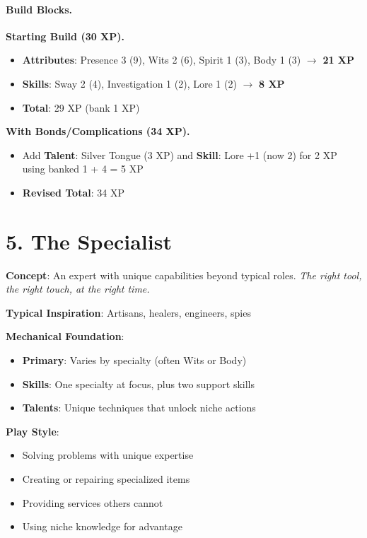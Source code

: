 \paragraph{Build Blocks.}
\textbf{Starting Build (30 XP).}
\begin{itemize}
\item \textbf{Attributes}: Presence 3 (9), Wits 2 (6), Spirit 1 (3), Body 1 (3) $\rightarrow$ \textbf{21 XP}
\item \textbf{Skills}: Sway 2 (4), Investigation 1 (2), Lore 1 (2) $\rightarrow$ \textbf{8 XP}
\item \textbf{Total}: 29 XP (bank 1 XP)
\end{itemize}
\textbf{With Bonds/Complications (34 XP).}
\begin{itemize}
\item Add \textbf{Talent}: Silver Tongue (3 XP) and \textbf{Skill}: Lore +1 (now 2) for 2 XP using banked 1 + 4 = 5 XP
\item \textbf{Revised Total}: 34 XP
\end{itemize}

\section{5. The Specialist}

\textbf{Concept}: An expert with unique capabilities beyond typical roles. \emph{The right tool, the right touch, at the right time.}

\textbf{Typical Inspiration}: Artisans, healers, engineers, spies

\textbf{Mechanical Foundation}:
\begin{itemize}
\item \textbf{Primary}: Varies by specialty (often Wits or Body)
\item \textbf{Skills}: One specialty at focus, plus two support skills
\item \textbf{Talents}: Unique techniques that unlock niche actions
\end{itemize}

\textbf{Play Style}:
\begin{itemize}
\item Solving problems with unique expertise
\item Creating or repairing specialized items
\item Providing services others cannot
\item Using niche knowledge for advantage
\end{itemize}

